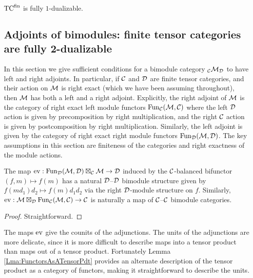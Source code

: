 \documentclass{amsart}
\begin{document}

\begin{theorem}
	${\mathrm{TC}^{\text{fin}}}$ is fully $1$-dualizable. 
\end{theorem}

\subsection{Adjoints of bimodules: finite tensor categories are fully 2-dualizable}  \label{sec-df-modules}

In this section we give sufficient conditions for a  bimodule category ${}_\mathcal C \mathcal M_\mathcal D$ to have left and right adjoints.  In particular, if $\mathcal C$ and $\mathcal D$ are finite tensor categories, and their action on $\mathcal M$ is right exact (which we have been assuming throughout), then $\mathcal M$ has both a left and a right adjoint.  Explicitly, the right adjoint of $\mathcal M$ is the category of right exact left module functors 
$\operatorname{Fun}_{{\mathcal C}}(\mathcal M, \mathcal C)$
 where the left $\mathcal D$ action is given by precomposition by right multiplication, and the right $\mathcal C$ action is given by postcomposition by right multiplication.  Similarly, the left adjoint is given by the category of right exact right module functors $\operatorname{Fun}_{\mathcal D}(\mathcal M, \mathcal D)$.  The key assumptions in this section are finiteness of the categories and right exactness of the module actions.

\begin{lemma}
The map $\mathrm{ev}: \operatorname{Fun}_{{\mathcal D}}(\mathcal M, \mathcal D) \boxtimes_{\mathcal C} \mathcal M \rightarrow \mathcal D$ induced by the $\mathcal C$-balanced bifunctor $(f,m) \mapsto f(m)$ has a natural $\mathcal D$--$\mathcal D$ bimodule structure given by $f(m d_1) d_2 \mapsto f(m) d_1 d_2$ via the right $\mathcal D$-module structure on $f$.  Similarly, $\mathrm{ev}: \mathcal M \boxtimes_{\mathcal D} \operatorname{Fun}_{\mathcal C}(\mathcal M, \mathcal C) \rightarrow \mathcal C$ is naturally a map of $\mathcal C$--$\mathcal C$ bimodule categories.
\end{lemma}
\begin{proof}
Straightforward.
\end{proof}

The maps $\mathrm{ev}$ give the counits of the adjunctions.  The units of the adjunctions are more delicate, since it is more difficult to describe maps into a tensor product than maps out of a tensor product. Fortunately Lemma \ref{Lma:FunctorsAsATensorPdt} provides an alternate description of the tensor product as a category of functors, making it straightforward  to describe the units.

\end{document}
